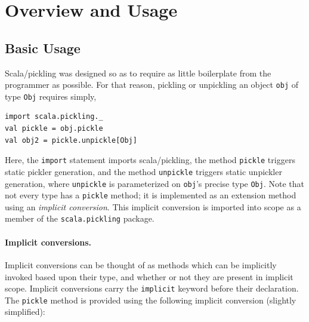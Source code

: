 \documentclass[10pt]{sigplanconf}
\theoremstyle{definition}
\theoremstyle{definition}
\newcommand{\term}[1]{\mbox{\texttt{#1}}}
\begin{document}



\section{Overview and Usage}
\label{sec:overview}

\subsection{Basic Usage}

Scala/pickling was designed so as to require as little
boilerplate from the programmer as possible. For that reason, pickling or
unpickling an object \term{obj} of type \term{Obj} requires simply,

\begin{lstlisting}
import scala.pickling._
val pickle = obj.pickle
val obj2 = pickle.unpickle[Obj]
\end{lstlisting}

Here, the \term{import} statement imports scala/pickling, the method
\term{pickle} triggers static pickler generation, and the method
\term{unpickle} triggers static unpickler generation, where \verb|unpickle| is
parameterized on \verb|obj|'s precise type \verb|Obj|. Note that not every
type has a \term{pickle} method; it is implemented as an extension method
using an {\em implicit conversion}. This implicit conversion is imported into
scope as a member of the \term{scala.pickling} package.

\paragraph{Implicit conversions.} Implicit conversions can be thought of as
methods which can be implicitly invoked based upon their type, and whether or
not they are present in implicit scope. Implicit conversions carry the
\term{implicit} keyword before their declaration. The \verb|pickle| method is
provided using the following implicit conversion (slightly simplified):
\end{document}
